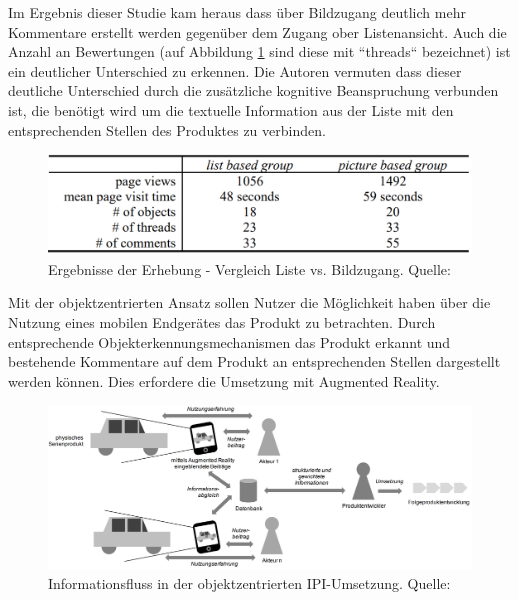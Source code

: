 Im Ergebnis dieser Studie kam heraus dass über Bildzugang deutlich mehr Kommentare erstellt werden gegenüber dem Zugang ober Listenansicht. Auch die Anzahl an Bewertungen (auf Abbildung \ref{img:ergebnisse_listen_bildzugang} sind diese mit ``threads`` bezeichnet) ist ein deutlicher Unterschied zu erkennen. Die Autoren vermuten dass dieser deutliche Unterschied durch die 
zusätzliche kognitive Beanspruchung verbunden ist, die benötigt wird um die textuelle Information aus der Liste mit den entsprechenden Stellen des Produktes zu verbinden.

\begin{figure}[H]
	\centering
	\includegraphics[width=.8\textwidth]{resources/analyse/results_list_picture_based.png}
	\caption{Ergebnisse der Erhebung - Vergleich Liste vs. Bildzugang. Quelle: \cite[S.~7]{Kirschner2011}}
	\label{img:ergebnisse_listen_bildzugang}
\end{figure}

Mit der objektzentrierten Ansatz sollen Nutzer die Möglichkeit haben über die Nutzung eines mobilen Endgerätes das Produkt zu betrachten. 
Durch entsprechende Objekterkennungsmechanismen das Produkt erkannt und bestehende Kommentare auf dem Produkt an entsprechenden Stellen dargestellt werden können.
Dies erfordere die Umsetzung mit Augmented Reality.\cite[S.~135]{Kirschner2012}

\begin{figure}[H]
	\centering
	\includegraphics[width=1.0\textwidth]{resources/analyse/IPI_Objektzentriert.png}
	\caption{Informationsfluss in der objektzentrierten IPI-Umsetzung. Quelle:\cite[S.~135]{Kirschner2012}}
	\label{img:objekt_centered_ipi}
\end{figure}

